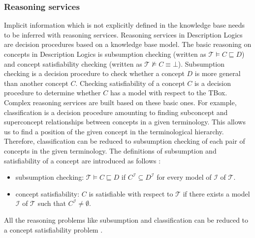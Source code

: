 \documentclass{article}
\begin{document}
\subsubsection{Reasoning services}
Implicit information which is not explicitly defined in the knowledge base needs to be inferred with reasoning services.
Reasoning services in Description Logics are decision procedures based on a knowledge base model. 
The basic reasoning on concepts in Description Logics is subsumption checking (written as $\mathcal{T}\vDash C\sqsubseteq D$) and 
concept satisfiability checking (written as $\mathcal{T}\nvDash C\equiv \bot$).
Subsumption checking is a decision procedure to check whether a concept $D$ is more general than another concept $C$.
Checking satisfiability of a concept $C$ is a decision procedure to determine whether $C$ has a model with respect to the TBox.
Complex reasoning services are built based on these basic ones. For example, classification is a decision procedure amounting to finding subconcept and superconcept 
relationships between concepts in a given terminology. This allows us to find a position of the given concept in the terminological hierarchy.
Therefore, classification can be reduced to subsumption checking of each pair of concepts in the given terminology.
The definitions of subsumption and satisfiability of a concept are introduced as follows \cite{baader2003description}:
\begin{itemize}
\item subsumption checking: $\mathcal{T}\vDash C\sqsubseteq D$ if $C^\mathcal{I}\subseteq D^\mathcal{I}$ for every model of $\mathcal{I}$ of $\mathcal{T}$.
\item concept satisfiability: $C$ is satisfiable with respect to $\mathcal{T}$ if there exists a model $\mathcal{I}$ of $\mathcal{T}$ such that $C^\mathcal{I}\neq \emptyset$.
\end{itemize}
All the reasoning problems like subsumption and classification can be reduced to a concept satisfiability problem \cite{baader2003description}.
\end{document}

